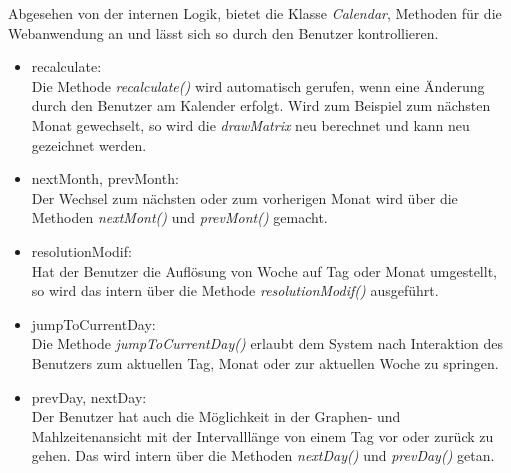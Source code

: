 \begin{itemize}
\end{itemize}

Abgesehen von der internen Logik, bietet die Klasse \emph{Calendar}, Methoden f\"ur die Webanwendung an
und l\"asst sich so durch den Benutzer kontrollieren.

\begin{itemize}


 \item recalculate:\\
 Die Methode \emph{recalculate()} wird automatisch gerufen, 
 wenn eine \"Anderung durch den Benutzer am Kalender erfolgt.
 Wird zum Beispiel zum n\"achsten Monat gewechselt, 
 so wird die \emph{drawMatrix} neu berechnet und kann neu gezeichnet werden.
 \item nextMonth, prevMonth:\\
 Der Wechsel zum n\"achsten oder zum vorherigen Monat wird \"uber die Methoden \emph{nextMont()} 
 und \emph{prevMont()} gemacht.
 \item resolutionModif:\\
 Hat der Benutzer die Aufl\"osung von Woche auf Tag oder Monat umgestellt, 
 so wird das intern \"uber die Methode \emph{resolutionModif()} ausgef\"uhrt.
 \item jumpToCurrentDay:\\
 Die Methode \emph{jumpToCurrentDay()} erlaubt dem System nach Interaktion des Benutzers zum aktuellen Tag, 
 Monat oder zur aktuellen Woche zu springen.
 \item prevDay, nextDay:\\
 Der Benutzer hat auch die M\"oglichkeit in der Graphen- und Mahlzeitenansicht 
 mit der Intervalll\"ange von einem Tag vor oder zur\"uck zu gehen.
 Das wird intern \"uber die Methoden \emph{nextDay()} und \emph{prevDay()} getan.
\end{itemize}